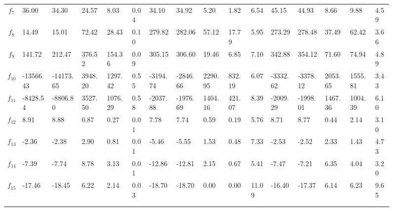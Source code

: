 \documentclass[paper=a4, fontsize=11pt]{scrartcl}
\numberwithin{equation}{section}
\numberwithin{figure}{section}
\numberwithin{table}{section}
\begin{document}
\begin{figure}
{{\begin{tabular}{c|lllll|lllll|lllll}
$f_7$    & 36.00     & 34.30      & 24.57       & 8.03      & 0.04      & 34.10             & 34.92             & 5.20          & 1.82          & 6.54      & 45.15          & 44.93             & 8.66              & 9.88          & 4.59     \\
$f_8$    & 14.49     & 15.01      & 72.42       & 28.43     & 0.10      & 279.82            & 282.06            & 57.12         & 17.79         & 5.95      & 273.29         & 278.48            & 37.49             & 62.42         & 3.66     \\
$f_9$    & 141.72    & 212.47     & 376.52      & 154.36    & 0.09      & 305.15            & 306.60            & 19.46         & 6.85          & 7.10      & 342.88         & 354.12            & 71.60             & 74.94         & 4.89     \\
$f_{10}$ & -13566.43 & -14173.65  & 3948.20 	& 1297.42   & 0.55      & -3194.74          & -2846.66          & 2290.95       & 832.19        & 6.07      & -3332.62       & -3378.12          & 2053.65           & 1555.81       & 3.43     \\
$f_{11}$ & -8428.54  & -8806.80   & 3527.50 	& 1076.29   & 0.58      & -2037.88          & -1976.69          & 1404.16       & 421.07        & 8.39      & -2009.29       & -1998.01          & 1467.36           & 1004.39       & 6.10     \\
$f_{12}$ & 8.91      & 8.88       & 0.87        & 0.27      & 0.01      & 7.78              & 7.74              & 0.59          & 0.19          & 5.76      & 8.71           & 8.77              & 0.44              & 2.14          & 3.10     \\
$f_{13}$ & -2.36     & -2.38      & 2.90        & 0.81      & 0.01      & -5.46             & -5.55             & 1.53          & 0.48          & 7.33      & -2.53          & -2.52             & 2.33              & 1.43          & 4.73     \\
$f_{14}$ & -7.39     & -7.74      & 8.78        & 3.13      & 0.01      & -12.86            & -12.81            & 2.15          & 0.67          & 5.41      & -7.47          & -7.21             & 6.35              & 4.04          & 3.20     \\
$f_{15}$ & -17.46    & -18.45     & 6.22        & 2.14      & 0.03      & -18.70            & -18.70            & 0.00          & 0.00          & 11.09     & -16.40         & -17.37            & 6.14              & 6.23          & 9.65     \\ \noalign{\smallskip}\hline\noalign{\smallskip}
     & & & & & & & & & & & & & & &       \\
\noalign{\smallskip}\hline\noalign{\smallskip} \multicolumn{16}{l}{\tiny $^1$ ThinkPad, 3.4GHz Intel Core i7 (3rd gen), 16 GB RAM}

\end{tabular}
}}

\end{figure}
\end{document}
